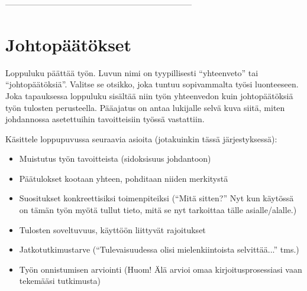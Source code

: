 \label{sec:esimluku}

 --------------------------------------------------------------------

\section{Johtopäätökset}

Loppuluku päättää työn. Luvun nimi on tyypillisesti ``yhteenveto'' tai
``johtopäätöksiä''. Valitse se otsikko, joka tuntuu sopivammalta työsi
luonteeseen. Joka tapauksessa loppuluku sisältää niin työn yhteenvedon
kuin johtopäätöksiä työn tulosten perusteella. Pääajatus on antaa
lukijalle selvä kuva siitä, miten johdannossa asetettuihin
tavoitteisiin työssä vastattiin.

Käsittele loppupuvussa seuraavia asioita (jotakuinkin tässä järjestyksessä):
%
\begin{itemize}
  \item Muistutus työn tavoitteista (sidoksisuus johdantoon)
  \item Päätulokset kootaan yhteen, pohditaan niiden merkitystä
  \item Suositukset konkreettisiksi toimenpiteiksi (``Mitä sitten?'' 
Nyt kun käytössä on tämän työn myötä tullut tieto, 
mitä se nyt tarkoittaa tälle asialle/alalle.)
  \item Tulosten soveltuvuus, käyttöön liittyvät rajoitukset
  \item Jatkotutkimustarve 
(``Tulevaisuudessa olisi mielenkiintoista selvittää...'' tms.)
  \item Työn onnistumisen arviointi 
(Huom! Älä arvioi omaa kirjoitusprosessiasi vaan tekemääsi tutkimusta)
\end{itemize}


